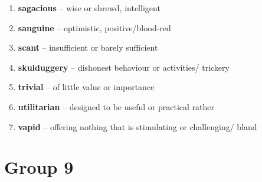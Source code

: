 \begin{enumerate}[wide,labelindent=0pt]
\item \textbf{sagacious} -- wise or shrewd, intelligent
\item \textbf{sanguine} -- optimistic, positive/blood-red
\item \textbf{scant} -- insufficient or barely sufficient
\item \textbf{skulduggery} -- dishonest behaviour or activities/ trickery
\item \textbf{trivial} -- of little value or importance
\item \textbf{utilitarian} -- designed to be useful or practical rather
\item \textbf{vapid} -- offering nothing that is stimulating or challenging/ bland
\end{enumerate}

\newpage
\section{\color{red}Group 9}

